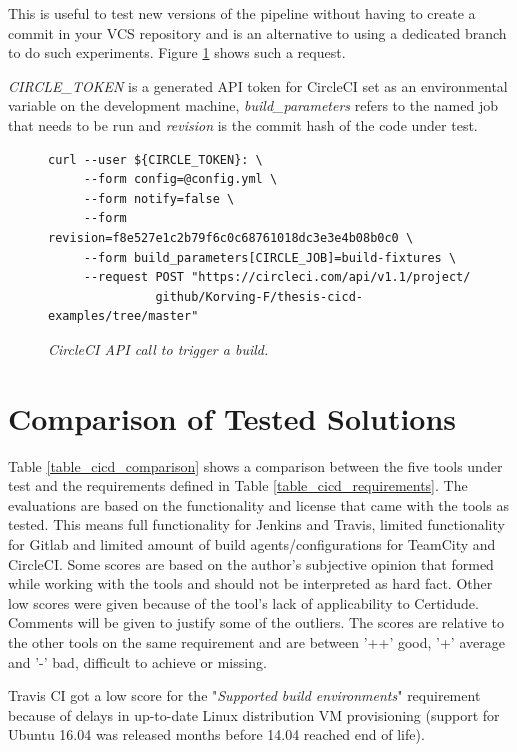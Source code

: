 This is useful to test new versions of the pipeline without having to create a commit in your VCS repository and is an alternative to using a dedicated branch to do such experiments. Figure \ref{fig:circle-api} shows such a request.

\textit{CIRCLE\_TOKEN} is a generated API token for CircleCI set as an environmental variable on the development machine, \textit{build\_parameters} refers to the named job that needs to be run and \textit{revision} is the commit hash of the code under test.

\begin{figure}[H]
\centering
\begin{lstlisting}[frame=single, basicstyle=\small, linewidth=\textwidth]
curl --user ${CIRCLE_TOKEN}: \
     --form config=@config.yml \
     --form notify=false \
     --form revision=f8e527e1c2b79f6c0c68761018dc3e3e4b08b0c0 \
     --form build_parameters[CIRCLE_JOB]=build-fixtures \
     --request POST "https://circleci.com/api/v1.1/project/
               github/Korving-F/thesis-cicd-examples/tree/master"
\end{lstlisting}
\caption{\vspace{-3mm}\textit{CircleCI API call to trigger a build.}}
\label{fig:circle-api}
\end{figure}

\section{Comparison of Tested Solutions}
Table \ref{table_cicd_comparison} shows a comparison between the five tools under test and the requirements defined in Table \ref{table_cicd_requirements}. The evaluations are based on the functionality and license that came with the tools as tested. This means full functionality for Jenkins and Travis, limited functionality for Gitlab and limited amount of build agents/configurations for TeamCity and CircleCI. Some scores are based on the author's subjective opinion that formed while working with the tools and should not be interpreted as hard fact. Other low scores were given because of the tool's lack of applicability to Certidude. Comments will be given to justify some of the outliers. The scores are relative to the other tools on the same requirement and are between '++' good, '+' average and '-' bad, difficult to achieve or missing.

Travis CI got a low score for the "\textit{Supported build environments}" requirement because of delays in up-to-date Linux distribution VM provisioning (support for Ubuntu 16.04 was released months before 14.04 reached end of life). 

